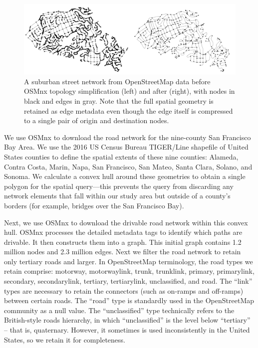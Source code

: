 \begin{figure}[htbp]
    \center
    \includegraphics[width=\textwidth]
    {graphics/simplification_before_after.png}
    \caption{A suburban street network from OpenStreetMap data before OSMnx topology simplification (left) and after (right), with nodes in black and edges in gray. Note that the full spatial geometry is retained as edge metadata even though the edge itself is compressed to a single pair of origin and destination nodes.}
    \label{fig:simplification_before_after}
\end{figure}

We use OSMnx to download the road network for the nine-county San Francisco Bay Area. We use the 2016 US Census Bureau TIGER/Line shapefile of United States counties to define the spatial extents of these nine counties: Alameda, Contra Costa, Marin, Napa, San Francisco, San Mateo, Santa Clara, Solano, and Sonoma. We calculate a convex hull around these geometries to obtain a single polygon for the spatial query---this prevents the query from discarding any network elements that fall within our study area but outside of a county's borders (for example, bridges over the San Francisco Bay).

Next, we use OSMnx to download the drivable road network within this convex hull. OSMnx processes the detailed metadata tags to identify which paths are drivable. It then constructs them into a graph. This initial graph contains 1.2 million nodes and 2.3 million edges. Next we filter the road network to retain only tertiary roads and larger. In OpenStreetMap terminology, the road types we retain comprise: motorway, motorway\textunderscore link, trunk, trunk\textunderscore link, primary, primary\textunderscore link, secondary, secondary\textunderscore link, tertiary, tertiary\textunderscore link, unclassified, and road. The \enquote{link} types are necessary to retain the connectors (such as on-ramps and off-ramps) between certain roads. The \enquote{road} type is standardly used in the OpenStreetMap community as a null value. The \enquote{unclassified} type technically refers to the British-style roads hierarchy, in which \enquote{unclassified} is the level below \enquote{tertiary} – that is, quaternary. However, it sometimes is used inconsistently in the United States, so we retain it for completeness.


